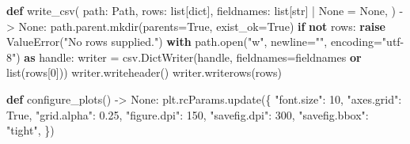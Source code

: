 \documentclass[
  12pt,
  12pt,a4paper,oneside]{report}
\newenvironment{Shaded}{}{}
\newcommand{\BuiltInTok}[1]{\textcolor[rgb]{0.00,0.50,0.00}{#1}}
\newcommand{\ControlFlowTok}[1]{\textcolor[rgb]{0.00,0.44,0.13}{\textbf{#1}}}
\newcommand{\DecValTok}[1]{\textcolor[rgb]{0.25,0.63,0.44}{#1}}
\newcommand{\FloatTok}[1]{\textcolor[rgb]{0.25,0.63,0.44}{#1}}
\newcommand{\ImportTok}[1]{\textcolor[rgb]{0.00,0.50,0.00}{\textbf{#1}}}
\newcommand{\KeywordTok}[1]{\textcolor[rgb]{0.00,0.44,0.13}{\textbf{#1}}}
\newcommand{\NormalTok}[1]{#1}
\newcommand{\OperatorTok}[1]{\textcolor[rgb]{0.40,0.40,0.40}{#1}}
\newcommand{\PreprocessorTok}[1]{\textcolor[rgb]{0.74,0.48,0.00}{#1}}
\newcommand{\StringTok}[1]{\textcolor[rgb]{0.25,0.44,0.63}{#1}}
\newcommand{\VariableTok}[1]{\textcolor[rgb]{0.10,0.09,0.49}{#1}}
\begin{document}
\begin{Shaded}
\begin{Highlighting}[]
\KeywordTok{def}\NormalTok{ write\_csv(}
\NormalTok{    path: Path, rows: }\BuiltInTok{list}\NormalTok{[}\BuiltInTok{dict}\NormalTok{], fieldnames: }\BuiltInTok{list}\NormalTok{[}\BuiltInTok{str}\NormalTok{] }\OperatorTok{|} \VariableTok{None} \OperatorTok{=} \VariableTok{None}\NormalTok{,}
\NormalTok{) }\OperatorTok{{-}\textgreater{}} \VariableTok{None}\NormalTok{:}
\NormalTok{    path.parent.mkdir(parents}\OperatorTok{=}\VariableTok{True}\NormalTok{, exist\_ok}\OperatorTok{=}\VariableTok{True}\NormalTok{)}
    \ControlFlowTok{if} \KeywordTok{not}\NormalTok{ rows:}
        \ControlFlowTok{raise} \PreprocessorTok{ValueError}\NormalTok{(}\StringTok{"No rows supplied."}\NormalTok{)}
    \ControlFlowTok{with}\NormalTok{ path.}\BuiltInTok{open}\NormalTok{(}\StringTok{"w"}\NormalTok{, newline}\OperatorTok{=}\StringTok{""}\NormalTok{, encoding}\OperatorTok{=}\StringTok{"utf{-}8"}\NormalTok{) }\ImportTok{as}\NormalTok{ handle:}
\NormalTok{        writer }\OperatorTok{=}\NormalTok{ csv.DictWriter(handle, fieldnames}\OperatorTok{=}\NormalTok{fieldnames }\KeywordTok{or} \BuiltInTok{list}\NormalTok{(rows[}\DecValTok{0}\NormalTok{]))}
\NormalTok{        writer.writeheader()}
\NormalTok{        writer.writerows(rows)}


\KeywordTok{def}\NormalTok{ configure\_plots() }\OperatorTok{{-}\textgreater{}} \VariableTok{None}\NormalTok{:}
\NormalTok{    plt.rcParams.update(\{}
        \StringTok{"font.size"}\NormalTok{: }\DecValTok{10}\NormalTok{,}
        \StringTok{"axes.grid"}\NormalTok{: }\VariableTok{True}\NormalTok{,}
        \StringTok{"grid.alpha"}\NormalTok{: }\FloatTok{0.25}\NormalTok{,}
        \StringTok{"figure.dpi"}\NormalTok{: }\DecValTok{150}\NormalTok{,}
        \StringTok{"savefig.dpi"}\NormalTok{: }\DecValTok{300}\NormalTok{,}
        \StringTok{"savefig.bbox"}\NormalTok{: }\StringTok{"tight"}\NormalTok{,}
\NormalTok{    \})}



\end{Highlighting}
\end{Shaded}
\end{document}
